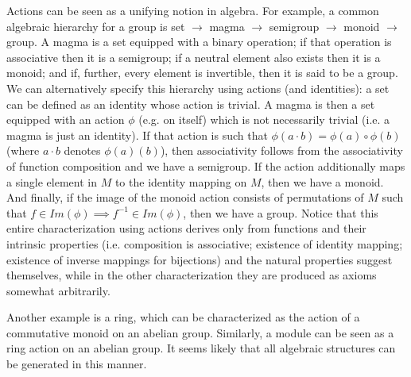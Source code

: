 \documentclass[pra,twocolumn,groupedaddress,10pt]{revtex4}
\theoremstyle{definition}
\begin{document}
Actions can be seen as a unifying notion in algebra. For example, a common algebraic hierarchy for a group is \textsf{set} $\rightarrow$ \textsf{magma} $\rightarrow$ \textsf{semigroup} $\rightarrow$ \textsf{monoid} $\rightarrow$ \textsf{group}. A magma is a set equipped with a binary operation; if that operation is associative then it is a semigroup; if a neutral element also exists then it is a monoid; and if, further, every element is invertible, then it is said to be a group. We can alternatively specify this hierarchy using actions (and identities): a set can be defined as an identity whose action is trivial. A magma is then a set equipped with an action $\phi$ (e.g. on itself) which is not necessarily trivial (i.e. a magma is just an identity). If that action is such that $\phi(a \cdot b) = \phi(a) \circ \phi(b)$ (where $a \cdot b$ denotes $\phi(a)(b)$), then associativity follows from the associativity of function composition and we have a semigroup. If the action additionally maps a single element in $M$ to the identity mapping on $M$, then we have a monoid. And finally, if the image of the monoid action consists of permutations of $M$ such that $f \in Im(\phi) \implies f^{-1} \in Im(\phi)$, then we have a group. Notice that this entire characterization using actions derives only from functions and their intrinsic properties (i.e. composition is associative; existence of identity mapping; existence of inverse mappings for bijections) and the natural properties suggest themselves, while in the other characterization they are produced as axioms somewhat arbitrarily.

Another example is a ring, which can be characterized as the action of a commutative monoid on an abelian group. Similarly, a module can be seen as a ring action on an abelian group. It seems likely that all algebraic structures can be generated in this manner.
\end{document}
